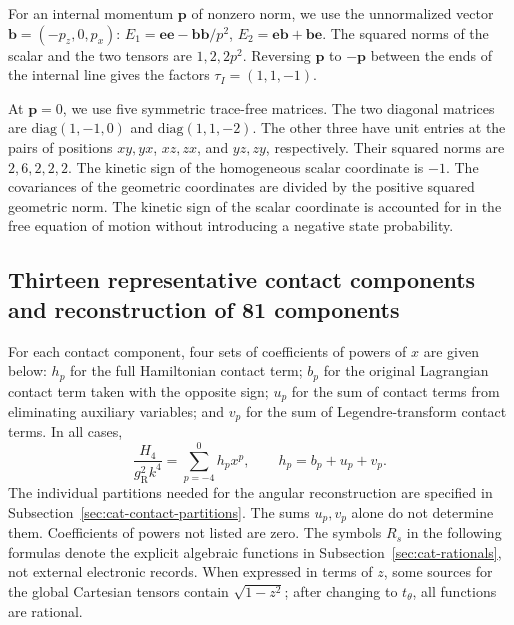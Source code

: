\documentclass[11pt,a4paper]{article}
\begin{document}
For an internal momentum $\mathbf p$ of nonzero norm, we use the unnormalized vector $\mathbf b=(-p_z,0,p_x)$: $E_1=\mathbf e\mathbf e-\mathbf b\mathbf b/p^2$, $E_2=\mathbf e\mathbf b+\mathbf b\mathbf e$. The squared norms of the scalar and the two tensors are $1,2,2p^2$. Reversing $\mathbf p$ to $-\mathbf p$ between the ends of the internal line gives the factors $\tau_I=(1,1,-1)$.

At $\mathbf p=0$, we use five symmetric trace-free matrices. The two diagonal matrices are $\mathrm{diag}(1,-1,0)$ and $\mathrm{diag}(1,1,-2)$. The other three have unit entries at the pairs of positions $xy,yx$, $xz,zx$, and $yz,zy$, respectively. Their squared norms are $2,6,2,2,2$. The kinetic sign of the homogeneous scalar coordinate is $-1$. The covariances of the geometric coordinates are divided by the positive squared geometric norm. The kinetic sign of the scalar coordinate is accounted for in the free equation of motion without introducing a negative state probability.

\subsection{Thirteen representative contact components and reconstruction of 81 components}
\label{sec:cat-contacts}
For each contact component, four sets of coefficients of powers of $x$ are given below: $h_p$ for the full Hamiltonian contact term; $b_p$ for the original Lagrangian contact term taken with the opposite sign; $u_p$ for the sum of contact terms from eliminating auxiliary variables; and $v_p$ for the sum of Legendre-transform contact terms. In all cases,
\begin{equation}
\frac{H_4}{g_{\mathrm R}^2k^4}=\sum_{p=-4}^{0}h_px^p,\qquad h_p=b_p+u_p+v_p.
\label{eq:cat-contact-parts}
\end{equation}
The individual partitions needed for the angular reconstruction are specified in Subsection~\ref{sec:cat-contact-partitions}. The sums $u_p,v_p$ alone do not determine them. Coefficients of powers not listed are zero. The symbols $R_s$ in the following formulas denote the explicit algebraic functions in Subsection~\ref{sec:cat-rationals}, not external electronic records. When expressed in terms of $z$, some sources for the global Cartesian tensors contain $\sqrt{1-z^2}$; after changing to $t_\theta$, all functions are rational.
\end{document}
